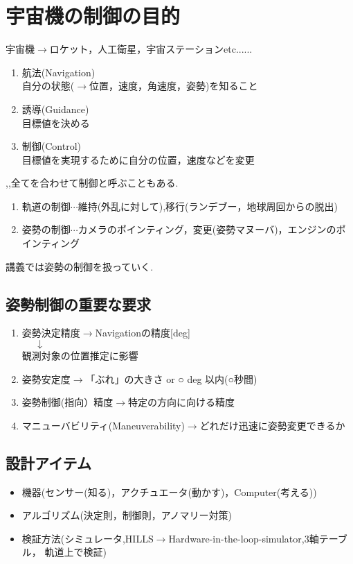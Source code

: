 \documentclass[class=article, crop=false, dvipdfmx, fleqn]{standalone}
\begin{document}
\section{宇宙機の制御の目的}

宇宙機$\rightarrow$ロケット，人工衛星，宇宙ステーションetc......
\begin{enumerate}[label = \maru{\theenumi}]
\item 航法(Navigation)\\
自分の状態($\rightarrow$位置，速度，角速度，姿勢)を知ること
\item 誘導(Guidance)\\
目標値を決める
\item 制御(Control)\\
目標値を実現するために自分の位置，速度などを変更
\end{enumerate}
,,全てを合わせて制御と呼ぶこともある.

\begin{enumerate}
      \renewcommand{\labelenumi}{\alph{enumi}).}
      \item 軌道の制御$\cdots$維持(外乱に対して),移行(ランデブー，地球周回からの脱出)
      \item 姿勢の制御$\cdots$カメラのポインティング，変更(姿勢マヌーバ)，エンジンのポインティング
\end{enumerate}
講義では姿勢の制御を扱っていく.


\subsection{姿勢制御の重要な要求}
\begin{enumerate}
\item 姿勢決定精度$\rightarrow$Navigationの精度[deg]\\
		$\mbox{    　}\downarrow$\\
 観測対象の位置推定に影響
\item 姿勢安定度$\rightarrow$「ぶれ」の大きさ  or ○ deg 以内(○秒間)
\item 姿勢制御(指向）精度$\rightarrow$特定の方向に向ける精度
\item マニューバビリティ(Maneuverability)$\rightarrow$どれだけ迅速に姿勢変更できるか
\end{enumerate}


\subsection{設計アイテム}
\begin{itemize}
\item 機器(センサー(知る)，アクチュエータ(動かす)，Computer(考える))
\item アルゴリズム(決定則，制御則，アノマリー対策)
\item 検証方法(シミュレータ,HILLS$\rightarrow$Hardware-in-the-loop-simulator,3軸テーブル，
軌道上で検証)
\end{itemize}
\end{document}
